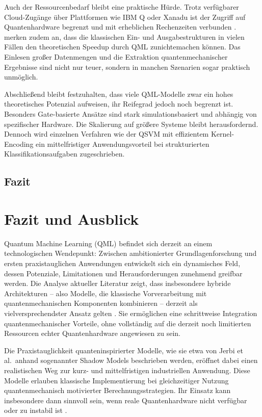 Auch der Ressourcenbedarf bleibt eine praktische Hürde. Trotz verfügbarer Cloud-Zugänge über Plattformen wie IBM Q oder Xanadu ist der Zugriff auf Quantenhardware begrenzt und mit erheblichen Rechenzeiten verbunden \cite{peral-garciaSystematicLiteratureReview2024}. \cite{zhangRecentAdvancesQuantum2020} merken zudem an, dass die klassischen Ein- und Ausgabestrukturen in vielen Fällen den theoretischen Speedup durch QML zunichtemachen können. Das Einlesen großer Datenmengen und die Extraktion quantenmechanischer Ergebnisse sind nicht nur teuer, sondern in manchen Szenarien sogar praktisch unmöglich.

Abschließend bleibt festzuhalten, dass viele QML-Modelle zwar ein hohes theoretisches Potenzial aufweisen, ihr Reifegrad jedoch noch begrenzt ist. Besonders Gate-basierte Ansätze sind stark simulationsbasiert und abhängig von spezifischer Hardware. Die Skalierung auf größere Systeme bleibt herausfordernd. Dennoch wird einzelnen Verfahren wie der QSVM mit effizientem Kernel-Encoding ein mittelfristiger Anwendungsvorteil bei strukturierten Klassifikationsaufgaben zugeschrieben.


\subsection{Fazit}

\section{Fazit und Ausblick}

Quantum Machine Learning (QML) befindet sich derzeit an einem technologischen Wendepunkt: Zwischen ambitionierter Grundlagenforschung und ersten praxistauglichen Anwendungen entwickelt sich ein dynamisches Feld, dessen Potenziale, Limitationen und Herausforderungen zunehmend greifbar werden. Die Analyse aktueller Literatur zeigt, dass insbesondere hybride Architekturen – also Modelle, die klassische Vorverarbeitung mit quantenmechanischen Komponenten kombinieren – derzeit als vielversprechendster Ansatz gelten \cite{liuQuantumTrainRethinkingHybrid2024, peral-garciaSystematicLiteratureReview2024}. Sie ermöglichen eine schrittweise Integration quantenmechanischer Vorteile, ohne vollständig auf die derzeit noch limitierten Ressourcen echter Quantenhardware angewiesen zu sein.

Die Praxistauglichkeit quanteninspirierter Modelle, wie sie etwa von Jerbi et al.\ anhand sogenannter Shadow Models beschrieben werden, eröffnet dabei einen realistischen Weg zur kurz- und mittelfristigen industriellen Anwendung. Diese Modelle erlauben klassische Implementierung bei gleichzeitiger Nutzung quantenmechanisch motivierter Berechnungsstrategien. Ihr Einsatz kann insbesondere dann sinnvoll sein, wenn reale Quantenhardware nicht verfügbar oder zu instabil ist \cite{jerbiShadowsQuantumMachine2024}.


